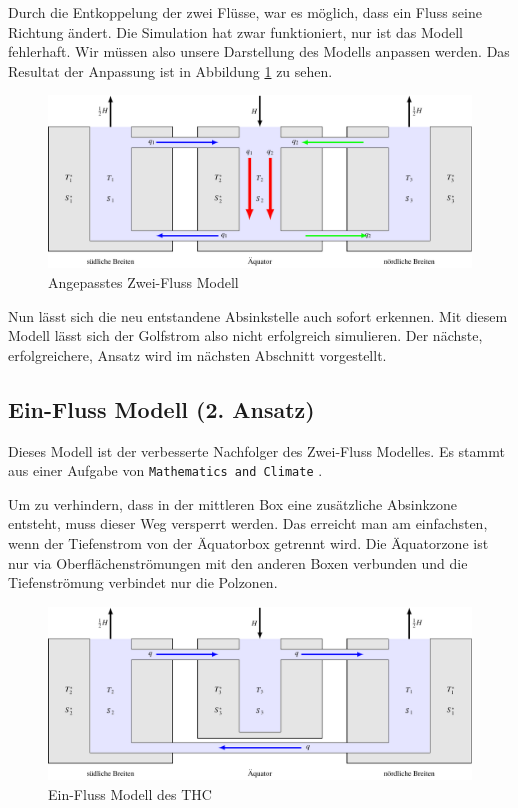 Durch die Entkoppelung der zwei Flüsse, war es möglich, dass ein Fluss seine Richtung ändert.
Die Simulation hat zwar funktioniert, nur ist das Modell fehlerhaft. Wir müssen also unsere Darstellung des Modells anpassen werden. Das Resultat der Anpassung ist in Abbildung \ref{thermohalin:3b2f-inverted} zu sehen.

\begin{figure}
	\centering
	\includegraphics[width=14cm]{thermohalin/tikz/3b2f-inverted.pdf}
	\caption{Angepasstes Zwei-Fluss Modell}
	\label{thermohalin:3b2f-inverted}
\end{figure}

Nun lässt sich die neu entstandene Absinkstelle auch sofort erkennen. 
Mit diesem Modell lässt sich der Golfstrom also nicht erfolgreich simulieren. 
Der nächste, erfolgreichere, Ansatz wird im nächsten Abschnitt vorgestellt.

\subsection{Ein-Fluss Modell (2. Ansatz)} 

Dieses Modell ist der verbesserte Nachfolger des Zwei-Fluss Modelles.
Es stammt aus einer Aufgabe von \texttt{Mathematics and Climate} \cite{skript:kaperengler}.

Um zu verhindern, dass in der mittleren Box eine zusätzliche Absinkzone entsteht, muss dieser Weg versperrt werden. Das erreicht man am einfachsten, wenn der Tiefenstrom von der Äquatorbox getrennt wird. Die Äquatorzone ist nur via Oberflächenströmungen mit den anderen Boxen verbunden und die Tiefenströmung verbindet nur die Polzonen.


\begin{figure}
	\centering
	\includegraphics[width=14cm]{thermohalin/tikz/3b1f.pdf}
	\caption{Ein-Fluss Modell des THC}
	\label{thermohalin:3b1f}
\end{figure}


